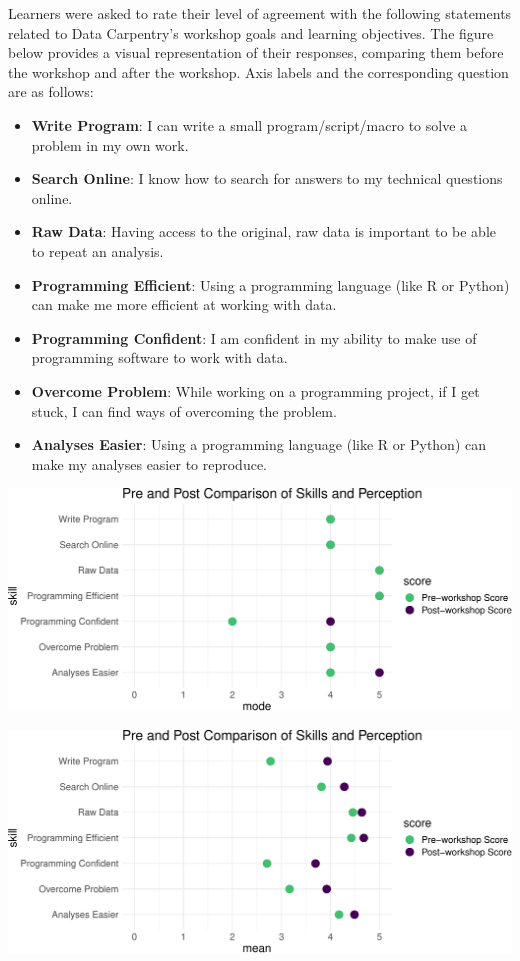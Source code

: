 \documentclass[]{article}
\providecommand{\tightlist}{%
  \setlength{\itemsep}{0pt}\setlength{\parskip}{0pt}}
\begin{document}
Learners were asked to rate their level of agreement with the following
statements related to Data Carpentry's workshop goals and learning
objectives. The figure below provides a visual representation of their
responses, comparing them before the workshop and after the workshop.
Axis labels and the corresponding question are as follows:

\begin{itemize}
\tightlist
\item
  \textbf{Write Program}: I can write a small program/script/macro to
  solve a problem in my own work.
\item
  \textbf{Search Online}: I know how to search for answers to my
  technical questions online.
\item
  \textbf{Raw Data}: Having access to the original, raw data is
  important to be able to repeat an analysis.
\item
  \textbf{Programming Efficient}: Using a programming language (like R
  or Python) can make me more efficient at working with data.
\item
  \textbf{Programming Confident}: I am confident in my ability to make
  use of programming software to work with data.
\item
  \textbf{Overcome Problem}: While working on a programming project, if
  I get stuck, I can find ways of overcoming the problem.
\item
  \textbf{Analyses Easier}: Using a programming language (like R or
  Python) can make my analyses easier to reproduce.
\end{itemize}

\includegraphics[width=720]{figures/dc-paired-data-mode-1}

\includegraphics[width=720]{figures/dc-paired-data-mean-1}
\end{document}
